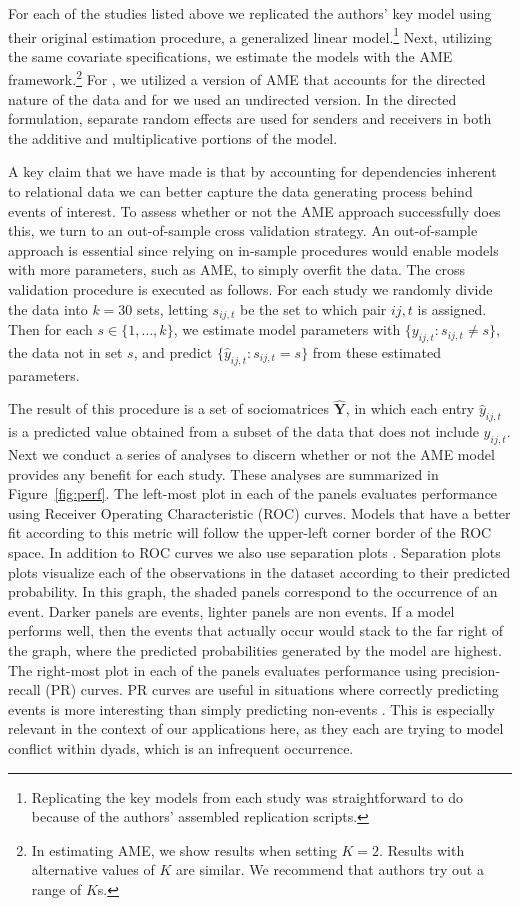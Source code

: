 For each of the studies listed above we replicated the authors' key model using their original estimation procedure, a generalized linear model.\footnote{Replicating the key models from each study was straightforward to do because of the authors' assembled replication scripts.} Next, utilizing the same covariate specifications, we estimate the models with the AME framework.\footnote{In estimating AME, we show results when setting $K=2$. Results with alternative values of $K$ are similar. We recommend that authors try out a range of $K$s.} For \citet{reiter:stam:2003, weeks:2012}, we utilized a version of AME that accounts for the directed nature of the data and for \citet{gibler:2017} we used an undirected version. In the directed formulation, separate random effects are used for senders and receivers in both the additive and multiplicative portions of the model.

A key claim that we have made is that by accounting for dependencies inherent to relational data we can better capture the data generating process behind events of interest. To assess whether or not the AME approach successfully does this, we turn to an out-of-sample cross validation strategy. An out-of-sample approach is essential since relying on in-sample procedures would enable models with more parameters, such as AME, to simply overfit the data. The cross validation procedure is executed as follows. For each study  we randomly divide the data into $k=30$ sets, letting $s_{ij,t}$ be the set to which pair $ij,t$ is assigned. Then for each $s \in \{1,\ldots,k\}$, we estimate model parameters with $\{y_{ij,t}: s_{ij,t} \neq s\}$, the data not in set $s$, and predict $\{\hat{y}_{ij,t}: s_{ij,t} = s\}$ from these estimated parameters.

The result of this procedure is a set of sociomatrices $\bm \hat Y$, in which each entry $\hat y_{ij,t}$ is a predicted value obtained from a subset of the data that does not include $y_{ij,t}$. Next we conduct a series of analyses to discern whether or not the AME model provides any benefit for each study. These analyses are summarized in Figure~\ref{fig:perf}. The left-most plot in each of the panels evaluates performance using Receiver Operating Characteristic (ROC) curves. Models that have a better fit according to this metric will follow the upper-left corner border of the ROC space. In addition to ROC curves we also use separation plots \citep{greenhill:etal:2011}.  Separation plots plots visualize each of the observations in the dataset according to their predicted probability. In this graph, the shaded panels correspond to the occurrence of an event. Darker panels are events, lighter panels are non events. If a model performs well, then the events that actually occur would stack to the far right of the graph, where the predicted probabilities generated by the model are highest. The right-most plot in each of the panels evaluates performance using precision-recall (PR) curves. PR curves are useful in situations where correctly predicting events is more interesting than simply predicting non-events \citep{davis:goadrich:2006}. This is especially relevant in the context of our applications here, as they each are trying to model conflict within dyads, which is an infrequent occurrence.

